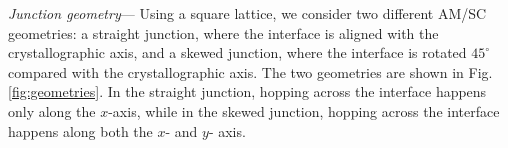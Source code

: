 \documentclass[aps,twocolumn,amsmath,amssymb,preprintnumbers,floatfix,prl,superscriptaddress,longbibliography]{revtex4-2}%
\begin{document}
\textit{Junction geometry}---
Using a square lattice, we consider two different AM/SC geometries: a straight junction, where the interface is aligned with the crystallographic axis, and a skewed junction, where the interface is rotated $45^\circ$ compared with the crystallographic axis. The two geometries are shown in Fig. \ref{fig:geometries}.
In the straight junction, hopping across the interface happens only along the $x$-axis, while in the skewed junction, hopping across the interface happens along both the $x$- and $y$- axis. 
\end{document}
